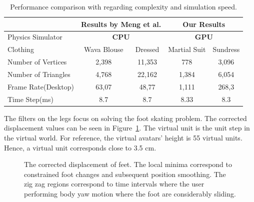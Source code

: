 \documentclass[number,preprint,review,12pt]{elsarticle}
\begin{document}
\begin{table}
\begin{center}
{\color{red}
\begin{tabular}{|l|c|c|c|c|} 

\hline   
						& \multicolumn{2}{c|}{\textbf{Results by Meng et al.\cite{Meng2010}}} & \multicolumn{2}{c|}{\textbf{Our Results}} \\ \hline
  Physics Simulator		& \multicolumn{2}{c|}{\textbf{CPU}} & \multicolumn{2}{c|}{\textbf{GPU}} \\ \hline 
  Clothing 				& Wava Blouse 	& Dressed 	& Martial Suit 	& Sundress 	\\ \hline
  Number of Vertices 	& 2,398 		& 11,353	& 778			& 3,096		\\ \hline
  Number of Triangles 	& 4,768 		& 22,162	& 1,384			& 6,054		\\ \hline
  Frame Rate(Desktop) 	& 63,07 		& 48,77		& 1,111			& 268,3		\\ \hline
  Time Step(ms) 		& 8.7  			& 8.7		& 8.33			& 8.3		\\ \hline
\end{tabular}
}
\end{center}  
\caption{{\color{red}Performance comparison with \cite{Meng2010} regarding complexity and simulation speed.}}
\label{tbl:fps_compare}
\end{table}


{\color{red}
The filters on the legs focus on solving the foot skating problem. The corrected displacement values can be seen in Figure~\ref{fig:footskating}. The virtual unit is the unit step in the virtual world. For reference, the virtual avatars' height is 55 virtual units. Hence, a virtual unit corresponds close to 3.5 cm.  
}


\begin{figure}[htbp] 
{\color{red}
	\begin{center} 
	\end{center}
	\caption{The corrected displacement of feet. The local minima correspond to constrained foot changes and subsequent position smoothing. The zig zag regions correspond to time intervals where the user performing body yaw motion where the foot are considerably sliding.}
	\label{fig:footskating}
}
\end{figure}
\end{document}
